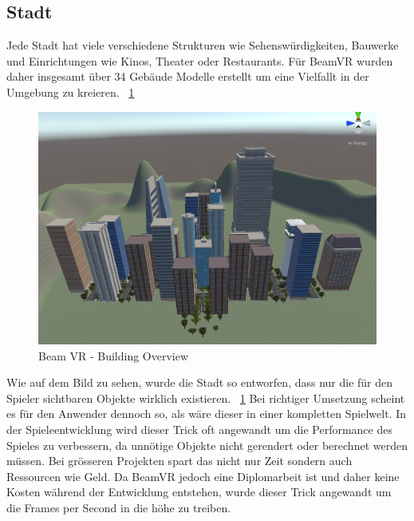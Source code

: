 \subsection{Stadt}\label{subsec:city}
Jede Stadt hat viele verschiedene Strukturen wie Sehensw\"urdigkeiten, Bauwerke und Einrichtungen wie Kinos, Theater oder Restaurants.
F\"ur BeamVR wurden daher insgesamt \"uber 34 Geb\"aude Modelle erstellt um eine Vielfallt in der Umgebung zu kreieren.
~\ref{fig:beamvr_building-variety}

\begin {figure}
    \centering
    \includegraphics[scale=0.18]{pics/beamvr_building-variety}
    \caption{Beam VR - Building Overview}
    \label{fig:beamvr_building-variety}
\end {figure}

Wie auf dem Bild zu sehen, wurde die Stadt so entworfen, dass nur die für den Spieler sichtbaren Objekte wirklich existieren.
~\ref{fig:beamvr_building-variety}
Bei richtiger Umsetzung scheint es für den Anwender dennoch so, als w\"are dieser in einer kompletten Spielwelt.
In der Spieleentwicklung wird dieser Trick oft angewandt um die Performance des Spieles zu verbessern, da unn\"otige Objekte nicht gerendert oder berechnet werden m\"ussen.
Bei gr\"osseren Projekten spart das nicht nur Zeit sondern auch Ressourcen wie Geld.
Da BeamVR jedoch eine Diplomarbeit ist und daher keine Kosten w\"ahrend der Entwicklung entstehen, wurde dieser Trick angewandt
um die Frames per Second in die h\"ohe zu treiben.


